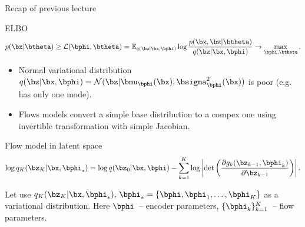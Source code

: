 \begin{frame}{Recap of previous lecture}
	\begin{block}{ELBO}
		\vspace{-0.3cm}
		\[
			p(\bx | \btheta) \geq \mathcal{L} (\bphi, \btheta)  = \mathbb{E}_{q(\bz | \bx, \bphi)} \log \frac{p(\bx, \bz | \btheta)}{q(\bz| \bx, \bphi)} \rightarrow \max_{\bphi, \btheta}.
		\]
		\vspace{-0.5cm}
	\end{block}
		\begin{itemize}
			\item Normal variational distribution $q(\bz | \bx, \bphi) = \mathcal{N}(\bz| \bmu_{\bphi}(\bx), \bsigma^2_{\bphi}(\bx))$ is poor (e.g. has only one mode). \\
			\item Flows models convert a simple base distribution to a compex one using invertible transformation with simple Jacobian. 
		\end{itemize}
	\begin{block}{Flow model in latent space}
		\vspace{-0.7cm}
		\[
			\log q_K(\bz_K | \bx, \bphi_*) = \log q(\bz_0 | \bx, \bphi) - \sum_{k=1}^K \log \left| \det \left( \frac{\partial g_k(\bz_{k - 1}, \bphi_k)}{\partial \bz_{k-1}} \right) \right|.
		\]
		\vspace{-0.5cm}
	\end{block}
	Let use $q_K(\bz_K | \bx, \bphi_*), \, \bphi_* = \{\bphi, \bphi_1, \dots, \bphi_K\}$ as a variational distribution. Here $\bphi$~-- encoder parameters, $\{\bphi_k\}_{k=1}^K$~-- flow parameters.
	
\end{frame}

